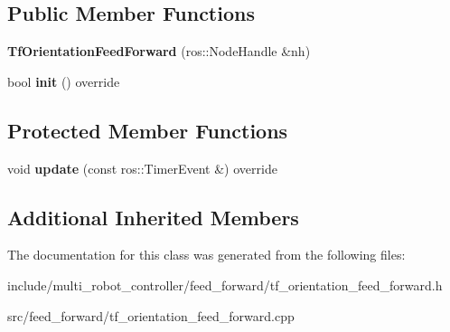 \subsection*{Public Member Functions}
\begin{DoxyCompactItemize}
\item 
\mbox{\label{classTfOrientationFeedForward_ac6b65030da947e765a431b5b82d600b1}} 
{\bfseries Tf\+Orientation\+Feed\+Forward} (ros\+::\+Node\+Handle \&nh)
\item 
\mbox{\label{classTfOrientationFeedForward_a68e54f0b974cc6aa5fab10ec5b5a18cf}} 
bool {\bfseries init} () override
\end{DoxyCompactItemize}
\subsection*{Protected Member Functions}
\begin{DoxyCompactItemize}
\item 
\mbox{\label{classTfOrientationFeedForward_aa74b9cf9be940b3d49bb6288fa88d2fa}} 
void {\bfseries update} (const ros\+::\+Timer\+Event \&) override
\end{DoxyCompactItemize}
\subsection*{Additional Inherited Members}


The documentation for this class was generated from the following files\+:\begin{DoxyCompactItemize}
\item 
include/multi\+\_\+robot\+\_\+controller/feed\+\_\+forward/tf\+\_\+orientation\+\_\+feed\+\_\+forward.\+h\item 
src/feed\+\_\+forward/tf\+\_\+orientation\+\_\+feed\+\_\+forward.\+cpp\end{DoxyCompactItemize}
